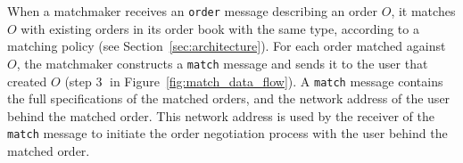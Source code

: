 When a matchmaker receives an \texttt{order} message describing an order $ O $, it matches $ O $ with existing orders in its order book with the same type, according to a matching policy (see Section~\ref{sec:architecture}).
For each order matched against $ O $, the matchmaker constructs a \texttt{match} message and sends it to the user that created $ O $ (step \textcircled{3} in Figure~\ref{fig:match_data_flow}).
A \texttt{match} message contains the full specifications of the matched orders, and the network address of the user behind the matched order.
This network address is used by the receiver of the \texttt{match} message to initiate the order negotiation process with the user behind the matched order.







